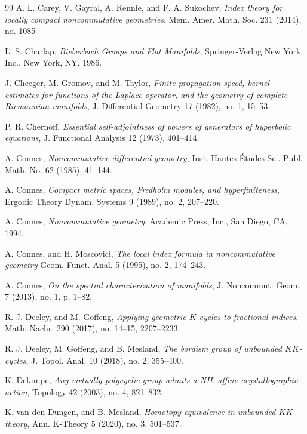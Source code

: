 \documentclass[a4paper,reqno]{amsart}
\numberwithin{equation}{section}
\theoremstyle{definition}
\theoremstyle{remark}
\begin{document}
\begin{thebibliography}{99}
 A. L. Carey, V. Gayral, A. Rennie, and F. A. Sukochev, \emph{Index theory for locally compact noncommutative geometries}, Mem. Amer. Math. Soc. 231 (2014), no. 1085

 L. S. Charlap, \emph{Bieberbach Groups and Flat Manifolds}, Springer-Verlag New York Inc., New York, NY, 1986.


 J. Cheeger, M. Gromov, and M. Taylor, \emph{Finite propagation speed, kernel estimates for functions of the Laplace operator, and the geometry of complete Riemannian manifolds}, J. Differential Geometry 17 (1982), no. 1, 15--53. 


 P. R. Chernoff, \emph{Essential self-adjointness of powers of generators of hyperbolic equations}, J. Functional Analysis 12 (1973), 401--414. 


 A. Connes, \emph{Noncommutative differential geometry}, Inst. Hautes Études Sci. Publ. Math. No. 62 (1985), 41--144.

 A. Connes, \emph{Compact metric spaces, Fredholm modules, and hyperfiniteness}, Ergodic Theory Dynam. Systems 9 (1989), no. 2, 207--220. 


 A. Connes, \emph{Noncommutative geometry}, Academic Press, Inc., San Diego, CA, 1994.


 A. Connes, and H. Moscovici, \emph{The local index formula in noncommutative geometry} Geom. Funct. Anal. 5 (1995), no. 2, 174--243. 




 A. Connes, \emph{On the spectral characterization of manifolds}, J. Noncommut. Geom. 7 (2013), no. 1, p. 1--82. 



 R. J. Deeley, and M. Goffeng, \emph{Applying geometric $K$-cycles to fractional indices}, Math. Nachr. 290 (2017), no. 14--15, 2207--2233.

 R. J. Deeley, M. Goffeng, and B. Mesland, \emph{The bordism group of unbounded $KK$-cycles}, J. Topol. Anal. 10 (2018), no. 2, 355--400.

 K. Dekimpe, \emph{Any virtually polycyclic group admits a NIL-affine crystallographic action}, Topology 42 (2003), no. 4, 821--832.

 K. van den Dungen, and B. Mesland, \emph{Homotopy equivalence in unbounded $KK$-theory}, Ann. K-Theory 5 (2020), no. 3, 501--537.


\end{thebibliography}
\end{document}
